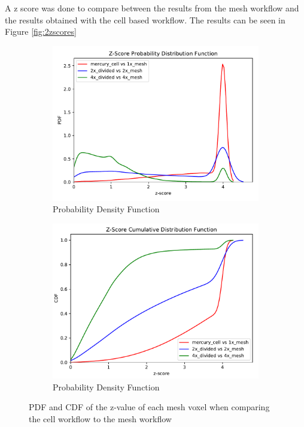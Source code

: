 A z score was done to compare between the results from the mesh workflow and the results
obtained with the cell based workflow. The results can be seen in Figure \ref{fig:2zscores}
%
\begin{figure}[H]
	\begin{subfigure}[h]{1.0\textwidth}
		\centering
		\includegraphics[scale=0.85, trim={0cm 0cm 0cm 0.9cm},clip]{../figs/toy_p2/PDF_zscore_VPII_all.pdf}
		\caption{Probability Density Function}
		\label{fig:2VPII_pdf}
	\end{subfigure}
	\begin{subfigure}[h]{1.0\textwidth}
		\centering
		\includegraphics[scale=0.85, trim={0cm 0cm 0cm 0.8cm},clip]{../figs/toy_p2/CDF_zscore_VPII_all.pdf}
		\caption{Probability Density Function}
		\label{fig:2VPII_cdf}
	\end{subfigure}
	\caption{PDF and CDF of the z-value of each mesh voxel when comparing the cell workflow to the mesh workflow}
	\label{fig:2z-scores}
\end{figure}
\newpage
